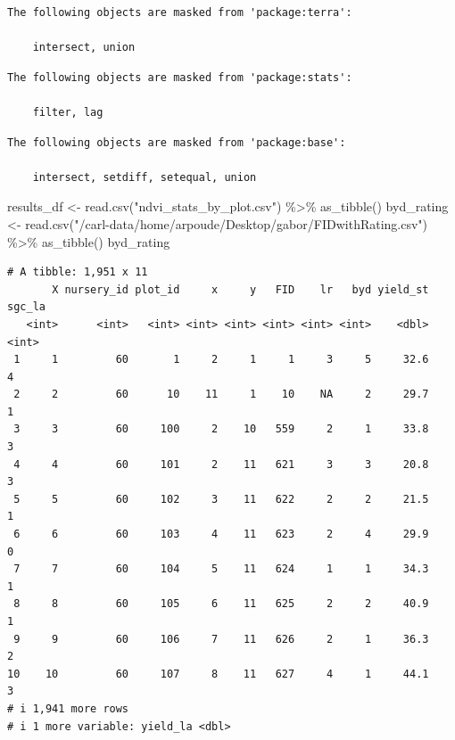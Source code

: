 \documentclass[
  letterpaper,
  DIV=11,
  numbers=noendperiod]{scrartcl}
\newenvironment{Shaded}{\begin{snugshade}}{\end{snugshade}}
\newcommand{\FunctionTok}[1]{\textcolor[rgb]{0.28,0.35,0.67}{#1}}
\newcommand{\NormalTok}[1]{\textcolor[rgb]{0.00,0.23,0.31}{#1}}
\newcommand{\OtherTok}[1]{\textcolor[rgb]{0.00,0.23,0.31}{#1}}
\newcommand{\SpecialCharTok}[1]{\textcolor[rgb]{0.37,0.37,0.37}{#1}}
\newcommand{\StringTok}[1]{\textcolor[rgb]{0.13,0.47,0.30}{#1}}
\begin{document}
\begin{verbatim}
The following objects are masked from 'package:terra':

    intersect, union
\end{verbatim}

\begin{verbatim}
The following objects are masked from 'package:stats':

    filter, lag
\end{verbatim}

\begin{verbatim}
The following objects are masked from 'package:base':

    intersect, setdiff, setequal, union
\end{verbatim}

\begin{Shaded}
\begin{Highlighting}[]
\NormalTok{results\_df }\OtherTok{\textless{}{-}} \FunctionTok{read.csv}\NormalTok{(}\StringTok{"ndvi\_stats\_by\_plot.csv"}\NormalTok{) }\SpecialCharTok{\%\textgreater{}\%} 
  \FunctionTok{as\_tibble}\NormalTok{()}
\NormalTok{byd\_rating }\OtherTok{\textless{}{-}} \FunctionTok{read.csv}\NormalTok{(}\StringTok{"/carl{-}data/home/arpoude/Desktop/gabor/FIDwithRating.csv"}\NormalTok{) }\SpecialCharTok{\%\textgreater{}\%} 
  \FunctionTok{as\_tibble}\NormalTok{()}
\NormalTok{byd\_rating}
\end{Highlighting}
\end{Shaded}

\begin{verbatim}
# A tibble: 1,951 x 11
       X nursery_id plot_id     x     y   FID    lr   byd yield_st sgc_la
   <int>      <int>   <int> <int> <int> <int> <int> <int>    <dbl>  <int>
 1     1         60       1     2     1     1     3     5     32.6      4
 2     2         60      10    11     1    10    NA     2     29.7      1
 3     3         60     100     2    10   559     2     1     33.8      3
 4     4         60     101     2    11   621     3     3     20.8      3
 5     5         60     102     3    11   622     2     2     21.5      1
 6     6         60     103     4    11   623     2     4     29.9      0
 7     7         60     104     5    11   624     1     1     34.3      1
 8     8         60     105     6    11   625     2     2     40.9      1
 9     9         60     106     7    11   626     2     1     36.3      2
10    10         60     107     8    11   627     4     1     44.1      3
# i 1,941 more rows
# i 1 more variable: yield_la <dbl>
\end{verbatim}
\end{document}
